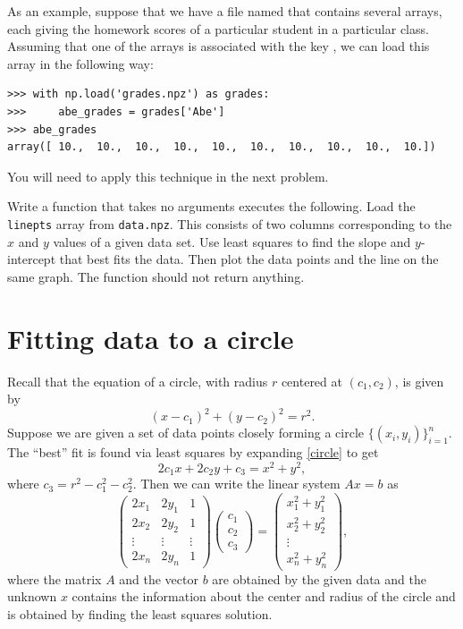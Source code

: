 As an example, suppose that we have a file named  that contains several arrays, each giving the
homework scores of a particular student in a particular class. Assuming that one of the arrays is associated with
the key , we can load this array in the following way:

\begin{lstlisting}
>>> with np.load('grades.npz') as grades:
>>>     abe_grades = grades['Abe']
>>> abe_grades
array([ 10.,  10.,  10.,  10.,  10.,  10.,  10.,  10.,  10.,  10.])
\end{lstlisting}

You will need to apply this technique in the next problem.

\begin{problem}
Write a function  that takes no arguments executes the following.
Load the \texttt{linepts} array from \texttt{data.npz}.
This consists of two columns corresponding to the $x$ and $y$ values of a given data set.  
Use least squares to find the slope and $y$-intercept that best fits the data.  
Then plot the data points and the line on the same graph.
The function should not return anything.
\end{problem}

\section*{Fitting data to a circle}

Recall that the equation of a circle, with radius $r$ centered at $(c_1,c_2)$, is given by
\begin{equation}
\label{circle}
(x-c_1)^2 + (y-c_2)^2 = r^2.
\end{equation}
Suppose we are given a set of data points closely forming a circle $\{(x_i,y_i)\}^n_{i=1}$.  
The ``best'' fit is found via least squares by expanding \eqref{circle} to get
\[
2 c_1 x + 2 c_2 y + c_3 = x^2 + y^2,
\]
where $c_3 = r^2 - c_1^2 - c_2^2$.  Then we can write the linear system $A x = b$ as
\[
\begin{pmatrix}
2 x_1 & 2 y_1 & 1\\
2 x_2 & 2 y_2 & 1\\
\vdots & \vdots & \vdots \\
2 x_n & 2 y_n & 1
\end{pmatrix}
\begin{pmatrix}
c_1\\
c_2\\
c_3
\end{pmatrix}=
\begin{pmatrix}
x_1^2 + y_1^2\\
x_2^2 + y_2^2\\
\vdots\\
x_n^2 + y_n^2
\end{pmatrix},
\]
where the matrix $A$ and the vector $b$ are obtained by the given data and the unknown
$x$ contains the information about the center and radius of the circle and is obtained 
by finding the least squares solution.

